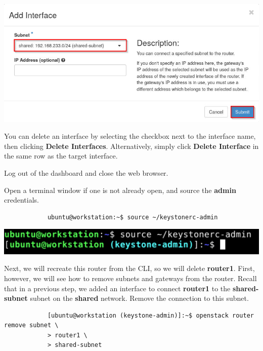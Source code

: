 \documentclass[letterpaper, 12pt]{article}
\begin{document}
\begin{enumerate}
\begin{labstep}
        \begin{center}
            \includegraphics[width=\linewidth]{images/part2/step6.png}
        \end{center}
    \end{labstep}

    \begin{tipbox}
        You can delete an interface by selecting the checkbox next to the interface name, then clicking \textbf{Delete Interfaces}.
        Alternatively, simply click \textbf{Delete Interface} in the same row as the target interface.
    \end{tipbox}

    \begin{labstep}
        Log out of the dashboard and close the web browser.
    \end{labstep}

    \begin{labstep}
        Open a terminal window if one is not already open, and source the \textbf{admin} credentials.
        \begin{lstlisting}
            ubuntu@workstation:~$ source ~/keystonerc-admin
        \end{lstlisting}

        \begin{center}
            \includegraphics[width=\linewidth]{images/part2/step8.png}
        \end{center}
    \end{labstep}

    \begin{labstep}
        Next, we will recreate this router from the CLI, so we will delete \textbf{router1}.
        First, however, we will see how to remove subnets and gateways from the router.
        Recall that in a previous step, we added an interface to connect \textbf{router1} to the \textbf{shared-subnet} subnet on the \textbf{shared} network.
        Remove the connection to this subnet.
        \begin{lstlisting}
            [ubuntu@workstation (keystone-admin)]:~$ openstack router remove subnet \
            > router1 \
            > shared-subnet
        \end{lstlisting}


\end{labstep}
\end{enumerate}
\end{document}
